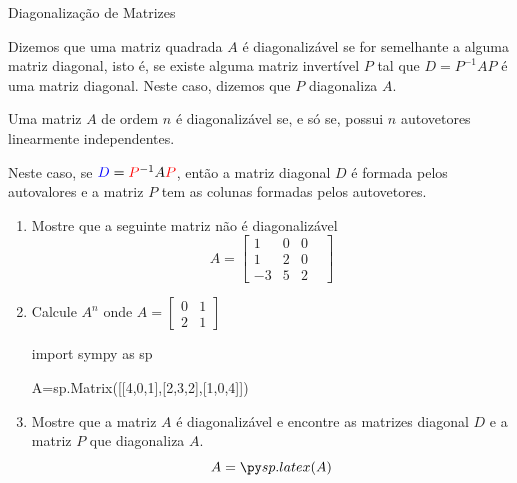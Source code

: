 \begin{frame}[label=autovalores]{Diagonalização de Matrizes}
\begin{defin}
Dizemos que uma matriz quadrada $A$ é {\color{blue}diagonalizável} se for semelhante a alguma matriz diagonal, isto é, se existe alguma matriz invertível $P$ tal que $D=P^{-1}AP$ é uma matriz diagonal. Neste caso, dizemos que $P$ {\color{blue}diagonaliza } $A$.
\end{defin}

\begin{teo}
Uma matriz $A$ de ordem $n$ é {\color{blue} diagonalizável} se, e só se, {\color{red}possui $n$ autovetores linearmente independentes}. 

Neste caso,  se ${\color{blue}D}={\color{red}P}^{-1}A{\color{red}P}$, então a  matriz diagonal {\color{blue}$D$ é formada pelos autovalores} e a matriz {\color{red}$P$ tem as colunas formadas pelos autovetores}.
\end{teo}

\end{frame}

\begin{frame}[label=autovalores,fragile=singleslide]{}
\begin{exe}
\begin{enumerate}
\item Mostre que a seguinte matriz não é diagonalizável
\[
A=\begin{bmatrix}
1& 0 & 0& \\ 1 & 2 & 0\\ -3 & 5 &  2
\end{bmatrix}
\]

\item Calcule $A^n$ onde $A=\begin{bmatrix}
0 & 1 \\ 2 & 1
\end{bmatrix}$

\begin{pycode}
import sympy as sp

A=sp.Matrix([[4,0,1],[2,3,2],[1,0,4]])
\end{pycode}

\item Mostre que a matriz $A$ é diagonalizável e encontre as matrizes diagonal $D$ e a matriz $P$ que diagonaliza $A$.
\[
A=\pyl{A}
\]
\end{enumerate}

\end{exe}

\end{frame}

